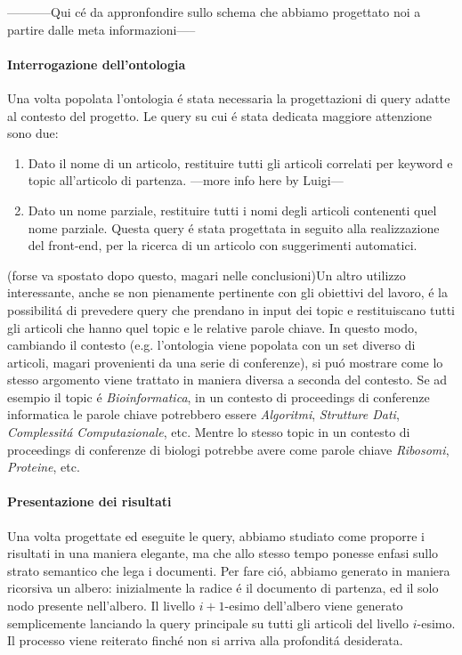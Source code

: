 \documentclass[11pt,twoside,a4paper]{article}
\begin{document}
-----------Qui c\'e da appronfondire sullo schema che abbiamo progettato noi a partire dalle meta informazioni-----

\paragraph{Interrogazione dell'ontologia}
\label{par:query}
Una volta popolata l'ontologia \'e stata necessaria la progettazioni di query adatte al contesto del progetto. Le query su cui \'e stata dedicata maggiore attenzione sono due:
\begin{enumerate}
	\item Dato il nome di un articolo, restituire tutti gli articoli correlati per keyword e topic all'articolo di partenza. ---more info here by Luigi---
	\item Dato un nome parziale, restituire tutti i nomi degli articoli contenenti quel nome parziale. Questa query \'e stata progettata in seguito alla realizzazione del front-end, per la ricerca di un articolo con suggerimenti automatici.
\end{enumerate}

(forse va spostato dopo questo, magari nelle conclusioni)Un altro utilizzo interessante, anche se non pienamente pertinente con gli obiettivi del lavoro, \'e la possibilit\'a di prevedere query che prendano in input dei topic e restituiscano tutti gli articoli che hanno quel topic e le relative parole chiave. In questo modo, cambiando il contesto (e.g. l'ontologia viene popolata con un set diverso di articoli, magari provenienti da una serie di conferenze), si pu\'o mostrare come lo stesso argomento viene trattato in maniera diversa a seconda del contesto. Se ad esempio il topic \'e \emph{Bioinformatica}, in un contesto di proceedings di conferenze informatica le parole chiave potrebbero essere \emph{Algoritmi}, \emph{Strutture Dati}, \emph{Complessit\'a Computazionale}, etc. Mentre lo stesso topic in un contesto di proceedings di conferenze di biologi potrebbe avere come parole chiave \emph{Ribosomi}, \emph{Proteine}, etc. 

\paragraph{Presentazione dei risultati}
\label{par:results}

Una volta progettate ed eseguite le query, abbiamo studiato come proporre i risultati in una maniera elegante, ma che allo stesso tempo ponesse enfasi sullo strato semantico che lega i documenti. Per fare ci\'o, abbiamo generato in maniera ricorsiva un albero: inizialmente la radice \'e il documento di partenza, ed il solo nodo presente nell'albero. Il livello $i+1$-esimo dell'albero viene generato semplicemente lanciando la query principale su tutti gli articoli del livello $i$-esimo. Il processo viene reiterato finch\'e non si arriva alla profondit\'a desiderata.
\end{document}
